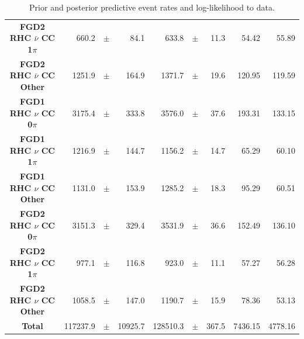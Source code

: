 \begin{center}
\begin{table}
\begin{adjustbox}{max width=1.1\textwidth,center}
\begin{tabular}{S||
                r
                p{0.26cm}
                r
                |r
                p{0.26cm}
                r
                |r
                r}
\textbf{FGD2 RHC $\bar{\nu}$ CC 1$\pi$} & 660.2 & $\pm$ & 84.1 & 633.8 & $\pm$ & 11.3 & 54.42 & 55.89 \\
\textbf{FGD2 RHC $\bar{\nu}$ CC Other} & 1251.9 & $\pm$ & 164.9 & 1371.7 & $\pm$ & 19.6 & 120.95 & 119.59\\ \hline
\textbf{FGD1 RHC $\nu$ CC 0$\pi$} & 3175.4 & $\pm$ & 333.8 & 3576.0 & $\pm$ & 37.6 & 193.31 & 133.15\\
\textbf{FGD1 RHC $\nu$ CC 1$\pi$} & 1216.9 & $\pm$ & 144.7 & 1156.2 & $\pm$ & 14.7 & 65.29 & 60.10\\
\textbf{FGD1 RHC $\nu$ CC Other} & 1131.0 & $\pm$ & 153.9 & 1285.2 & $\pm$ & 18.3 & 95.29 & 60.51\\ \hline
\textbf{FGD2 RHC $\nu$ CC 0$\pi$} & 3151.3 & $\pm$ & 329.4 & 3531.9 & $\pm$ & 36.6 & 152.49 & 136.10\\
\textbf{FGD2 RHC $\nu$ CC 1$\pi$} & 977.1 & $\pm$ & 116.8 & 923.0 & $\pm$ & 11.1 & 57.27 & 56.28\\
\textbf{FGD2 RHC $\nu$ CC Other} & 1058.5 & $\pm$ & 147.0 & 1190.7 & $\pm$ & 15.9 & 78.36 & 53.13 \\ \hline
\textbf{Total} & 117237.9 & $\pm$ & 10925.7 & 128510.3 & $\pm$ & 367.5 & 7436.15 & 4778.16 \\ \hline\hline
\end{tabular}
\end{adjustbox}
\caption{Prior and posterior predictive event rates and log-likelihood to data.}
\label{tab:predrates}
\end{table}
\end{center}

